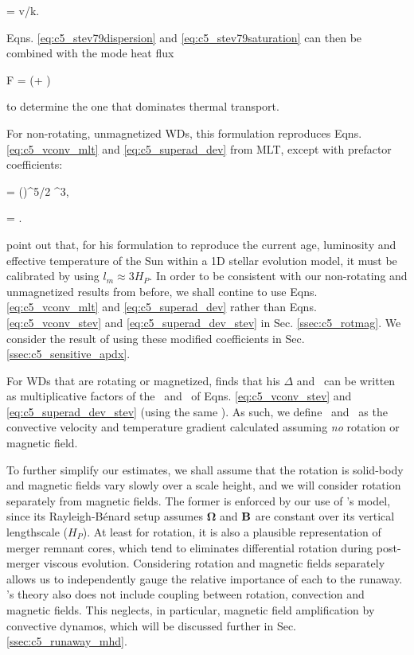 \eqbegin
\sigma = v/k.
\label{eq:c5_stev79saturation}
\eqend

\noindent Eqns. \ref{eq:c5_stev79dispersion} and \ref{eq:c5_stev79saturation} can then be combined with the mode heat flux

\eqbegin
F = \left(\sigma + \right)
\label{eq:c5_stev79flux}
\eqend

\noindent to determine the one that dominates thermal transport.

For non-rotating, unmagnetized WDs, this formulation reproduces Eqns. \ref{eq:c5_vconv_mlt} and \ref{eq:c5_superad_dev} from MLT, except with prefactor coefficients:

\eqbegin
\Fconv = \left(\right)^{5/2} \vconv^3,
\label{eq:c5_vconv_stev}
\eqend

\eqbegin
\dnabconv = .
\label{eq:c5_superad_dev_stev}
\eqend

\noindent \citeal{stev79} point out that, for his formulation to reproduce the current age, luminosity and effective temperature of the Sun within a 1D stellar evolution model, it must be calibrated by using $l_m \approx 3H_P$.  In order to be consistent with our non-rotating and unmagnetized results from before, we shall contine to use Eqns. \ref{eq:c5_vconv_mlt} and \ref{eq:c5_superad_dev} rather than Eqns. \ref{eq:c5_vconv_stev} and \ref{eq:c5_superad_dev_stev} in Sec. \ref{ssec:c5_rotmag}.  We consider the result of using these modified coefficients in Sec. \ref{ssec:c5_sensitive_apdx}.


For WDs that are rotating or magnetized, \citeal{stev79} finds that his $\Delta$ and \vconv\ can be written as multiplicative factors of the \dnabconv\ and \vconv\ of Eqns. \ref{eq:c5_vconv_stev} and \ref{eq:c5_superad_dev_stev} (using the same \Fconv).  As such, we define \vconvzero\ and \dnabconvzero\ as the convective velocity and temperature gradient calculated assuming \textit{no} rotation or magnetic field.

To further simplify our estimates, we shall assume that the rotation is solid-body and magnetic fields vary slowly over a scale height, and we will consider rotation separately from magnetic fields.  The former is enforced by our use of \citeal{stev79}'s model, since its Rayleigh-B\'{e}nard setup assumes $\boldsymbol{\Omega}$ and ${\bf B}$ are constant over its vertical lengthscale ($H_P$).  At least for rotation, it is also a plausible representation of merger remnant cores, which tend to eliminates differential rotation during post-merger viscous evolution.  Considering rotation and magnetic fields separately allows us to independently gauge the relative importance of each to the runaway.  \citeal{stev79}'s theory also does not include coupling between rotation, convection and magnetic fields.  This neglects, in particular, magnetic field amplification by convective dynamos, which will be discussed further in Sec. \ref{ssec:c5_runaway_mhd}.

